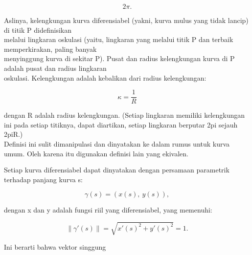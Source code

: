 \documentclass{article}
\begin{document}
\begin{eulernotebook}
\begin{eulercomment}
\begin{eulercomment}
\begin{eulercomment}
\begin{eulercomment}
\begin{eulercomment}
\end{eulercomment}
\begin{eulerformula}
\[
2\pi.
\]
\end{eulerformula}
\begin{eulercomment}
\begin{eulercomment}
\begin{eulercomment}
\end{eulercomment}
\begin{eulercomment}
Aslinya, kelengkungan kurva diferensiabel (yakni, kurva mulus yang
tidak lancip) di titik P didefinisikan\\
melalui lingkaran oskulasi (yaitu, lingkaran yang melalui titik P dan
terbaik memperkirakan, paling banyak\\
menyinggung kurva di sekitar P). Pusat dan radius kelengkungan kurva
di P adalah pusat dan radius lingkaran\\
oskulasi. Kelengkungan adalah kebalikan dari radius kelengkungan:

\end{eulercomment}
\begin{eulerformula}
\[
\kappa =\frac {1}{R}
\]
\end{eulerformula}
\begin{eulercomment}
dengan R adalah radius kelengkungan. (Setiap lingkaran memiliki
kelengkungan ini pada setiap titiknya, dapat diartikan, setiap
lingkaran berputar 2pi sejauh 2piR.)\\
Definisi ini sulit dimanipulasi dan dinyatakan ke dalam rumus untuk
kurva umum. Oleh karena itu digunakan definisi lain yang ekivalen.

\end{eulercomment}
\begin{eulercomment}
Setiap kurva diferensiabel dapat dinyatakan dengan persamaan
parametrik terhadap panjang kurva s:

\end{eulercomment}
\begin{eulerformula}
\[
\gamma(s) = (x(s),\ y(s)),
\]
\end{eulerformula}
\begin{eulercomment}
dengan x dan y adalah fungsi riil yang diferensiabel, yang memenuhi:

\end{eulercomment}
\begin{eulerformula}
\[
\|\gamma'(s)\|=\sqrt{x'(s)^2+y'(s)^2}=1.
\]
\end{eulerformula}
\begin{eulercomment}
Ini berarti bahwa vektor singgung



\end{eulercomment}
\end{eulercomment}
\end{eulercomment}
\end{eulercomment}
\end{eulercomment}
\end{eulercomment}
\end{eulercomment}
\end{eulernotebook}
\end{document}
